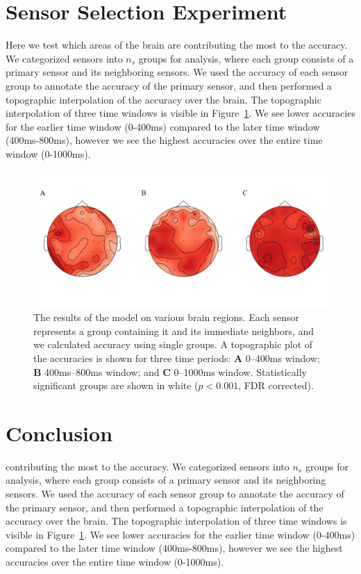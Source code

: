 \section{Sensor Selection Experiment} Here we test which areas of the brain are 
contributing the most to the \tvt accuracy. We categorized sensors into $n_s$ 
groups for analysis, where each group consists of a primary sensor and its 
neighboring sensors. We used the accuracy of each sensor group to annotate the 
accuracy of the primary sensor, and then performed a topographic interpolation 
of the \tvt accuracy over the brain. The topographic interpolation of three 
time windows is visible in Figure~\ref{fig:topographic}. We see lower \tvt 
accuracies for the earlier time window (0-400ms) compared to the later time 
window (400ms-800ms), however we see the highest accuracies over the entire 
time window (0-1000ms).

\begin{figure}[t]
  \centering
  \includegraphics[width=0.9\linewidth]{figures/topographic}
  \caption{The results of the model on various brain regions. Each sensor represents a group containing it and its immediate neighbors, and we calculated \tvt accuracy using single groups.  A topographic plot of the \tvt accuracies is shown for three time periods: {\bf A}  0--400ms window; {\bf B} 400ms--800ms window; and {\bf C} 0--1000ms window. Statistically significant groups are shown in white ($p < 0.001$, FDR corrected).}
  \label{fig:topographic}
\end{figure}

\section{Conclusion}
contributing the most to the \tvt accuracy. We categorized sensors into $n_s$ 
groups for analysis, where each group consists of a primary sensor and its 
neighboring sensors. We used the accuracy of each sensor group to annotate the 
accuracy of the primary sensor, and then performed a topographic interpolation 
of the \tvt accuracy over the brain. The topographic interpolation of three 
time windows is visible in Figure~\ref{fig:topographic}. We see lower \tvt 
accuracies for the earlier time window (0-400ms) compared to the later time 
window (400ms-800ms), however we see the highest accuracies over the entire 
time window (0-1000ms).
